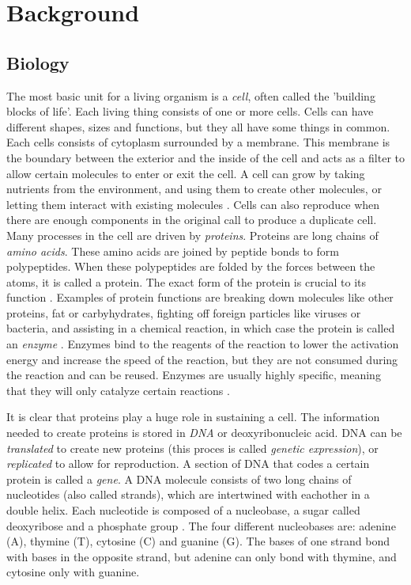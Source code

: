 \documentclass[../main/thesis.tex]{subfiles}
\begin{document}
\chapter{Background}
\ifdefined\main
\acresetall
\newcommand{\codePath}{../2_background/code/}
\newcommand{\figPath}{../2_background/figures/}
\else

\fi


\section{Biology}
The most basic unit for a living organism is a \textit{cell}, often called the 'building blocks of life'.
Each living thing consists of one or more cells.
Cells can have different shapes, sizes and functions, but they all have some things in common.
Each cells consists of cytoplasm surrounded by a membrane.
This membrane is the boundary between the exterior and the inside of the cell and acts as a filter to allow certain molecules to enter or exit the cell.
A cell can grow by taking nutrients from the environment, and using them to create other molecules, or letting them interact with existing molecules \cite{bioinformatics}.
Cells can also reproduce when there are enough components in the original call to produce a duplicate cell.
Many processes in the cell are driven by \textit{proteins}.
Proteins are long chains of \textit{amino acids}.
These amino acids are joined by peptide bonds to form polypeptides.
When these polypeptides are folded by the forces between the atoms, it is called a protein.
The exact form of the protein is crucial to its function \cite{protein_misfolding}.
Examples of protein functions are breaking down molecules like other proteins, fat or carbyhydrates, fighting off foreign particles like viruses or bacteria, and assisting in a chemical reaction, in which case the protein is called an \textit{enzyme} \cite{protein_function}.
Enzymes bind to the reagents of the reaction to lower the activation energy and increase the speed of the reaction, but they are not consumed during the reaction and can be reused.
Enzymes are usually highly specific, meaning that they will only catalyze certain reactions \cite{enzyme_specificity1}\cite{enzyme_specificity2}.

It is clear that proteins play a huge role in sustaining a cell.
The information needed to create proteins is stored in \textit{DNA} or deoxyribonucleic acid.
DNA can be \textit{translated} to create new proteins (this proces is called \textit{genetic expression}), or \textit{replicated} to allow for reproduction.
A section of DNA that codes a certain protein is called a \textit{gene}.
A DNA molecule consists of two long chains of nucleotides (also called strands), which are intertwined with eachother in a double helix.
Each nucleotide is composed of a nucleobase, a sugar called deoxyribose and a phosphate group \cite{dna_structure}.
The four different nucleobases are: adenine (A), thymine (T), cytosine (C) and guanine (G).
The bases of one strand bond with bases in the opposite strand, but adenine can only bond with thymine, and cytosine only with guanine.
\end{document}
